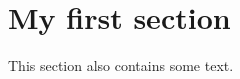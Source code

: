\usepackage{fancyhdr}
\pagestyle{fancy} 

\fancyhf{}

\fancyhead[L]{\leftmark}
\fancyhead[R]{\rightmark} %
\renewcommand{\headrulewidth}{0.5pt}
\fancyfoot[C]{\thepage}
\renewcommand{\footrulewidth}{0.5pt}

\section{My first section}
This section also contains some text.

